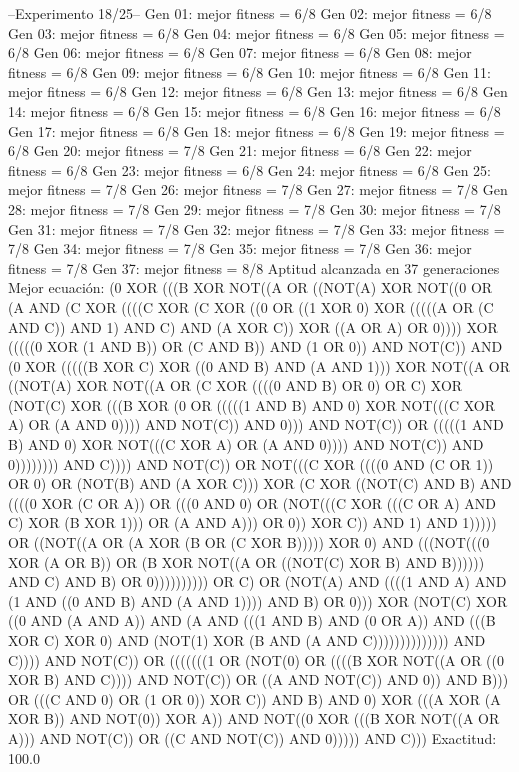 --Experimento 
 18/25--
Gen 01: mejor fitness = 6/8
Gen 02: mejor fitness = 6/8
Gen 03: mejor fitness = 6/8
Gen 04: mejor fitness = 6/8
Gen 05: mejor fitness = 6/8
Gen 06: mejor fitness = 6/8
Gen 07: mejor fitness = 6/8
Gen 08: mejor fitness = 6/8
Gen 09: mejor fitness = 6/8
Gen 10: mejor fitness = 6/8
Gen 11: mejor fitness = 6/8
Gen 12: mejor fitness = 6/8
Gen 13: mejor fitness = 6/8
Gen 14: mejor fitness = 6/8
Gen 15: mejor fitness = 6/8
Gen 16: mejor fitness = 6/8
Gen 17: mejor fitness = 6/8
Gen 18: mejor fitness = 6/8
Gen 19: mejor fitness = 6/8
Gen 20: mejor fitness = 7/8
Gen 21: mejor fitness = 6/8
Gen 22: mejor fitness = 6/8
Gen 23: mejor fitness = 6/8
Gen 24: mejor fitness = 6/8
Gen 25: mejor fitness = 7/8
Gen 26: mejor fitness = 7/8
Gen 27: mejor fitness = 7/8
Gen 28: mejor fitness = 7/8
Gen 29: mejor fitness = 7/8
Gen 30: mejor fitness = 7/8
Gen 31: mejor fitness = 7/8
Gen 32: mejor fitness = 7/8
Gen 33: mejor fitness = 7/8
Gen 34: mejor fitness = 7/8
Gen 35: mejor fitness = 7/8
Gen 36: mejor fitness = 7/8
Gen 37: mejor fitness = 8/8
Aptitud alcanzada en 37 generaciones
Mejor ecuación: (0 XOR (((B XOR NOT((A OR ((NOT(A) XOR NOT((0 OR (A AND (C XOR ((((C XOR (C XOR ((0 OR ((1 XOR 0) XOR (((((A OR (C AND C)) AND 1) AND C) AND (A XOR C)) XOR ((A OR A) OR 0)))) XOR (((((0 XOR (1 AND B)) OR (C AND B)) AND (1 OR 0)) AND NOT(C)) AND (0 XOR (((((B XOR C) XOR ((0 AND B) AND (A AND 1))) XOR NOT((A OR ((NOT(A) XOR NOT((A OR (C XOR ((((0 AND B) OR 0) OR C) XOR (NOT(C) XOR (((B XOR (0 OR (((((1 AND B) AND 0) XOR NOT(((C XOR A) OR (A AND 0)))) AND NOT(C)) AND 0))) AND NOT(C)) OR (((((1 AND B) AND 0) XOR NOT(((C XOR A) OR (A AND 0)))) AND NOT(C)) AND 0)))))))) AND C)))) AND NOT(C)) OR NOT(((C XOR ((((0 AND (C OR 1)) OR 0) OR (NOT(B) AND (A XOR C))) XOR (C XOR ((NOT(C) AND B) AND ((((0 XOR (C OR A)) OR (((0 AND 0) OR (NOT(((C XOR (((C OR A) AND C) XOR (B XOR 1))) OR (A AND A))) OR 0)) XOR C)) AND 1) AND 1))))) OR ((NOT((A OR (A XOR (B OR (C XOR B))))) XOR 0) AND (((NOT(((0 XOR (A OR B)) OR (B XOR NOT((A OR ((NOT(C) XOR B) AND B)))))) AND C) AND B) OR 0)))))))))) OR C) OR (NOT(A) AND ((((1 AND A) AND (1 AND ((0 AND B) AND (A AND 1)))) AND B) OR 0))) XOR (NOT(C) XOR ((0 AND (A AND A)) AND (A AND (((1 AND B) AND (0 OR A)) AND (((B XOR C) XOR 0) AND (NOT(1) XOR (B AND (A AND C)))))))))))))) AND C)))) AND NOT(C)) OR (((((((1 OR (NOT(0) OR ((((B XOR NOT((A OR ((0 XOR B) AND C)))) AND NOT(C)) OR ((A AND NOT(C)) AND 0)) AND B))) OR (((C AND 0) OR (1 OR 0)) XOR C)) AND B) AND 0) XOR (((A XOR (A XOR B)) AND NOT(0)) XOR A)) AND NOT((0 XOR (((B XOR NOT((A OR A))) AND NOT(C)) OR ((C AND NOT(C)) AND 0))))) AND C)))
 Exactitud: 100.0%


